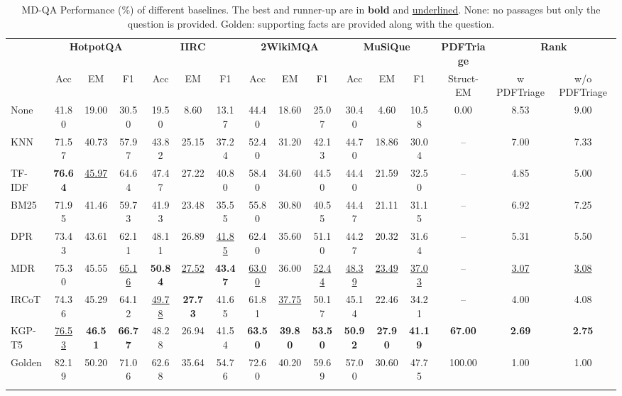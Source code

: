 
\begin{table}[t!]
\centering
\scriptsize
\caption{MD-QA Performance (\%) of different baselines. The best and runner-up are in \textbf{bold} and \underline{underlined}. None: no passages but only the question is provided. Golden: supporting facts are provided along with the question.}
\begin{tabular}{l|ccc|ccc|ccc|ccc|c|cc}
\Xhline{2\arrayrulewidth}
\multirow{2}{*}{\textbf{Method}} & \multicolumn{3}{c|}{\textbf{HotpotQA}} & \multicolumn{3}{c|}{\textbf{IIRC}} & \multicolumn{3}{c|}{\textbf{2WikiMQA}} & \multicolumn{3}{c|}{\textbf{MuSiQue}} & \textbf{PDFTriage} & \multicolumn{2}{c}{\textbf{Rank}} \\

 & Acc & EM & F1 & Acc & EM & F1 & Acc & EM & F1 & Acc & EM & F1 & Struct-EM & w PDFTriage & w/o PDFTriage\\
\Xhline{2\arrayrulewidth}
None & 41.80 & 19.00 & 30.50 & 19.50 & 8.60 & 13.17 & 44.40 & 18.60 & 25.07 & 30.40 & 4.60 & 10.58 & 0.00 & 8.53 & 9.00\\
\hline
KNN & 71.57 & 40.73 & 57.97 & 43.82 & 25.15 & 37.24 & 52.40 & 31.20 & 42.13 & 44.70 & 18.86 & 30.04 & -- & 7.00 & 7.33\\
TF-IDF & \textbf{76.64} & \underline{45.97} & 64.64 & 47.47 & 27.22 & 40.80 & 58.40 & 34.60 & 44.50 & 44.40 & 21.59 & 32.50 & -- & 4.85 & 5.00\\
BM25 & 71.95 & 41.46 & 59.73 & 41.93 & 23.48 & 35.55 & 55.80 & 30.80 & 40.55 & 44.47 & 21.11 & 31.15 & -- & 6.92 & 7.25\\
\hline
DPR & 73.43 & 43.61 & 62.11 & 48.11 & 26.89 & \underline{41.85} & 62.40 & 35.60 & 51.10 & 44.27 & 20.32 & 31.64  & -- & 5.31 & 5.50\\
MDR & 75.30 & 45.55 & \underline{65.16} & \textbf{50.84} & \underline{27.52} & \textbf{43.47} & \underline{63.00} & 36.00 & \underline{52.44} & \underline{48.39} & \underline{23.49} & \underline{37.03}  & -- & \underline{3.07} & \underline{3.08}\\
\hline
IRCoT & 74.36 & 45.29 & 64.12 & \underline{49.78} & \textbf{27.73} & 41.65 & 61.81 & \underline{37.75} & 50.17 & 45.14 & 22.46 & 34.21 & -- & 4.00 & 4.08\\
\hline
KGP-T5  & \underline{76.53} & \textbf{46.51} & \textbf{66.77} & 48.28 & 26.94 & 41.54 & \textbf{63.50} & \textbf{39.80} & \textbf{53.50} & \textbf{50.92} & \textbf{27.90} & \textbf{41.19} & \textbf{67.00} & \textbf{2.69} & \textbf{2.75}\\
\hline
Golden & 82.19 & 50.20 & 71.06 & 62.68 & 35.64 & 54.76 & 72.60 & 40.20 & 59.69 & 57.00 & 30.60 & 47.75 & 100.00 & 1.00 & 1.00\\
\Xhline{2\arrayrulewidth}
\end{tabular}
\label{tab-mainperform10}
\vspace{-4ex}
\end{table}

